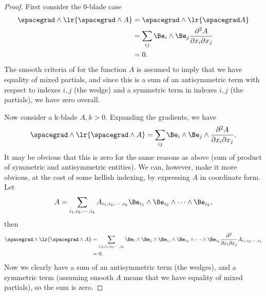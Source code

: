 \begin{proof}
First consider the 0-blade case
\begin{equation}\label{eqn:vectorcalc:480}
\begin{aligned}
\spacegrad \wedge \lr{ \spacegrad \wedge A }
&=
\spacegrad \wedge \lr{ \spacegrad A } \\
&=
\sum_{ij} \Be_i \wedge \Be_j \frac{\partial^2 A}{\partial x_i \partial x_j} \\
&= 0.
\end{aligned}
\end{equation}
The smooth criteria of for the function \( A \) is assumed to imply that we have equality of mixed partials, and since this is a sum of an antisymmetric term with respect to indexes \( i, j \) (the wedge) and a symmetric term in indexes \( i, j \) (the partials), we have zero overall.

Now consider a k-blade \( A, k > 0 \).  Expanding the gradients, we have
\begin{equation}\label{eqn:vectorcalc:500}
\spacegrad \wedge \lr{ \spacegrad \wedge A }
=
\sum_{ij} \Be_i \wedge \Be_j \wedge \frac{\partial^2 A}{\partial x_i \partial x_j}.
\end{equation}
It may be obvious that this is zero for the same reasons as above (sum of product of symmetric and antisymmetric entities).  We can, however, make it more obvious, at the cost of some hellish indexing, by expressing \( A \) in coordinate form.  Let
\begin{equation}\label{eqn:vectorcalc:520}
A = \sum_{i_1, i_2, \cdots, i_k}
A_{i_1, i_2, \cdots, i_k} \Be_{i_1} \wedge \Be_{i_2} \wedge \cdots \wedge \Be_{i_k},
\end{equation}
then
\begin{equation}\label{eqn:vectorcalc:540}
\begin{aligned}
\spacegrad \wedge \lr{ \spacegrad \wedge A }
&=
\sum_{i,j,i_1, i_2, \cdots, i_k} \Be_i \wedge \Be_j \wedge \Be_{i_1} \wedge \Be_{i_2} \wedge \cdots \wedge \Be_{i_k}
\frac{\partial^2 }{\partial x_i \partial x_j}  A_{i_1, i_2, \cdots, i_k}  \\
&= 0.
\end{aligned}
\end{equation}
Now we clearly have a sum of an antisymmetric term (the wedges), and a symmetric term (assuming smooth \( A \) means that we have equality of mixed partials), so the sum is zero.


\end{proof}
